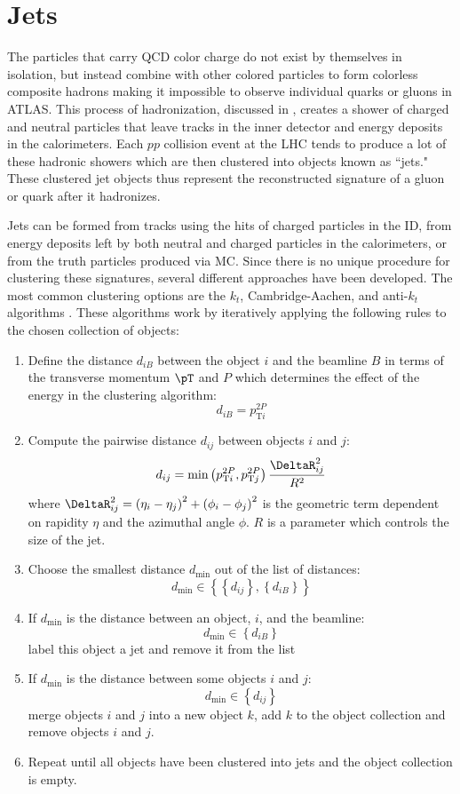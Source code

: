 \section{Jets} \label{sec:objects:jets}

The particles that carry QCD color charge do not exist by themselves in
isolation, but instead combine with other colored particles to form colorless
composite hadrons making it impossible to observe individual quarks or gluons
in ATLAS. This process of hadronization, discussed in ,
creates a shower of charged and neutral particles that leave tracks in the
inner detector and energy deposits in the calorimeters.  Each $pp$ collision
event at the LHC tends to produce a lot of these hadronic showers which are
then clustered into objects known as ``jets."  These clustered jet objects thus
represent the reconstructed signature of a gluon or quark after it hadronizes.

Jets can be formed from tracks using the hits of charged particles in the ID,
from energy deposits left by both neutral and charged particles in the
calorimeters, or from the truth particles produced via MC.  Since there is
no unique procedure for clustering these signatures, several different
approaches have been developed. The most common clustering options are the
$k_{t}$, Cambridge-Aachen, and anti-$k_{t}$ algorithms \cite{Cacciari:2008gp}.
These algorithms work by iteratively applying the following rules to the
chosen collection of objects:

\begin{enumerate}
  \item Define the distance $d_{iB}$ between the object $i$ and the beamline $B$ in terms of the transverse momentum $\pT$ and $P$ which determines the effect of the energy in the clustering algorithm: \[ d_{iB} = p_{\text{T}i}^{2P} \]
  \item Compute the pairwise distance $d_{ij}$ between objects $i$ and $j$: \[ d_{ij} = \textrm{min}\left(p_{\text{T}i}^{2P}, p_{\text{T}j}^{2P}\right) \frac{\DeltaR_{ij}^{2}}{R^{2}} \] where $\DeltaR_{ij}^{2} = \left(\eta_{i} - \eta_{j}\right)^{2} + \left(\phi_{i} - \phi_{j}\right)^{2}$ is the geometric term dependent on rapidity $\eta$ and the azimuthal angle $\phi$.  $R$ is a parameter which controls the size of the jet.
  \item Choose the smallest distance $d_{\text{min}}$ out of the list of distances: \[ d_{\mathrm{min}} \in \left\{\left\{d_{ij}\right\},\left\{d_{iB}\right\}\right\} \] 
  \item If $d_{\text{min}}$ is the distance between an object, $i$, and the beamline: \[ d_{\mathrm{min}} \in \left\{d_{iB}\right\} \] label this object a jet and remove it from the list
  \item If $d_{\text{min}}$ is the distance between some objects $i$ and $j$: \[ d_{\mathrm{min}} \in \left\{d_{ij}\right\} \] merge objects $i$ and $j$ into a new object $k$, add $k$ to the object collection and remove objects $i$ and $j$.
  \item Repeat until all objects have been clustered into jets and the object collection is empty.
\end{enumerate}


